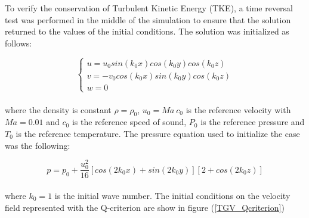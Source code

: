 \documentclass[a5paper]{sapthesis}
\begin{document}
	\noindent To verify the conservation of Turbulent Kinetic Energy (TKE), a time reversal test was performed in the middle of the simulation to ensure that the solution returned to the values of the initial conditions. 
	The solution was initialized as follows:
	
	\begin{equation}
		\begin{cases}
			u = u_0 sin(k_0 x)cos(k_0 y)cos(k_0 z)\\
			v = -v_0 cos(k_0 x)sin(k_0 y)cos(k_0 z)\\
			w = 0
		\end{cases}
	\end{equation}
	\\
	where the density is constant $\rho = \rho_0$, $u_0 = Ma \ c_0$ is the reference velocity with $Ma = 0.01$ and $c_0$ is the reference speed of sound, $P_0$ is the reference pressure and $T_0$ is the reference temperature. The pressure equation used to initialize the case was the following:
	
	\begin{equation}
		p = p_0 + \frac{u_0^2}{16}[cos(2k_0 x)+sin(2k_0 y)][2+ cos(2k_0 z)]		
	\end{equation}
	\\
	where $k_0 = 1$ is the initial wave number. 
	The initial conditions on the velocity field represented with the Q-criterion are show in figure (\ref{TGV_Qcriterion})
	
\end{document}
